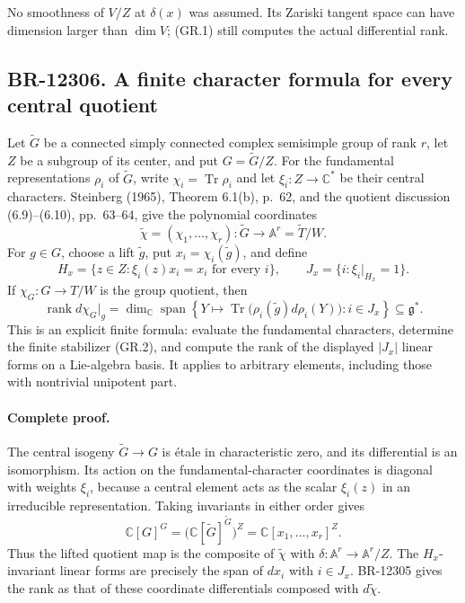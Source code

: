 No smoothness of $V/Z$ at $\delta(x)$ was assumed.  Its Zariski
tangent space can have dimension larger than $\dim V$; (GR.1)
still computes the actual differential rank.

\subsection{BR-12306. A finite character formula for every central quotient}
Let $\widetilde G$ be a connected simply connected complex
semisimple group of rank $r$, let $Z$ be a subgroup of its center,
and put $G=\widetilde G/Z$.  For the fundamental representations
$\rho_i$ of $\widetilde G$, write
$\chi_i=\operatorname{Tr}\rho_i$ and let $\xi_i:Z\to\mathbb C^*$
be their central characters.  Steinberg (1965), Theorem 6.1(b),
p.~62, and the quotient discussion (6.9)--(6.10), pp.~63--64,
give the polynomial coordinates
\[
 \widetilde\chi=(\chi_1,\ldots,\chi_r):
 \widetilde G\longrightarrow\mathbb A^r
       =\widetilde T/W.
\]
For $g\in G$, choose a lift $\widetilde g$, put
$x_i=\chi_i(\widetilde g)$, and define
\[
 H_x=\{z\in Z:\xi_i(z)x_i=x_i\text{ for every }i\},
 \qquad J_x=\{i:\xi_i|_{H_x}=1\}.
 \tag{GR.2}
\]
If $\chi_G:G\to T/W$ is the group quotient, then
\[
 \operatorname{rank}d\chi_G|_g
 =\dim_{\mathbb C}\operatorname{span}
 \left\{Y\longmapsto
 \operatorname{Tr}\bigl(\rho_i(\widetilde g)d\rho_i(Y)\bigr)
 :i\in J_x\right\}\subseteq\mathfrak g^*.
 \tag{GR.3}
\]
This is an explicit finite formula: evaluate the fundamental
characters, determine the finite stabilizer (GR.2), and compute
the rank of the displayed $|J_x|$ linear forms on a Lie-algebra
basis.  It applies to arbitrary elements, including those with
nontrivial unipotent part.

\paragraph{Complete proof.}
The central isogeny $\widetilde G\to G$ is \'etale in characteristic
zero, and its differential is an isomorphism.  Its action on the
fundamental-character coordinates is diagonal with weights $\xi_i$,
because a central element acts as the scalar $\xi_i(z)$ in an
irreducible representation.  Taking invariants in either order gives
\[
 \mathbb C[G]^G
 =\bigl(\mathbb C[\widetilde G]^{\widetilde G}\bigr)^Z
 =\mathbb C[x_1,\ldots,x_r]^Z.
\]
Thus the lifted quotient map is the composite of
$\widetilde\chi$ with $\delta:\mathbb A^r\to\mathbb A^r/Z$.
The $H_x$-invariant linear forms are precisely the span of $dx_i$
with $i\in J_x$.  BR-12305 gives the rank as that of these
coordinate differentials composed with $d\widetilde\chi$.

